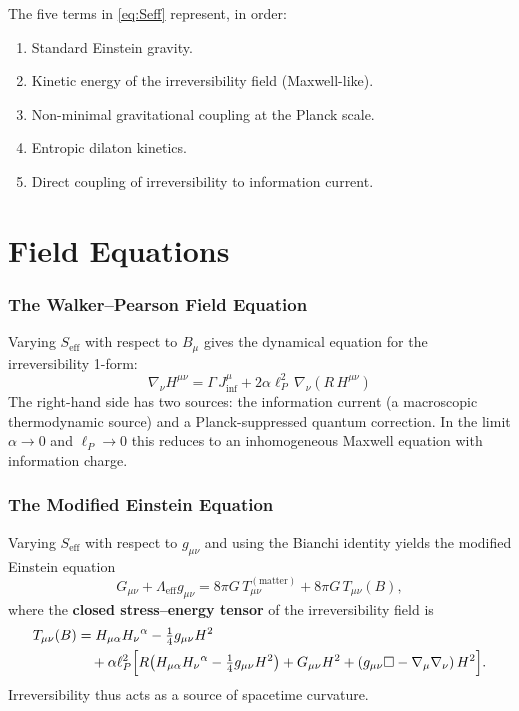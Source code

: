 \documentclass[12pt,a4paper]{article}
\newcommand{\gm}{g_{\mu\nu}}       %
\newcommand{\lP}{\ell_P}           %
\newcommand{\Seff}{S_{\text{eff}}} %
\begin{document}
The five terms in \eqref{eq:Seff} represent, in order:
\begin{enumerate}
  \item Standard Einstein gravity.
  \item Kinetic energy of the irreversibility field (Maxwell-like).
  \item Non-minimal gravitational coupling at the Planck scale.
  \item Entropic dilaton kinetics.
  \item Direct coupling of irreversibility to information current.
\end{enumerate}

\part{Field Equations}

\section{The Walker--Pearson Field Equation}
\label{sec:WP-eq}

Varying $\Seff$ with respect to $B_\mu$ gives the dynamical equation for the
irreversibility 1-form:
\begin{equation}
  \boxed{
  \nabla_\nu H^{\mu\nu}
  = \Gamma\, J_{\inf}^{\mu}
    + 2\alpha\lP^2\,\nabla_\nu\!\left(R\,H^{\mu\nu}\right)
  }
  \label{eq:WP}
\end{equation}
The right-hand side has two sources: the information current (a macroscopic
thermodynamic source) and a Planck-suppressed quantum correction.  In the limit
$\alpha\to 0$ and $\lP\to 0$ this reduces to an inhomogeneous Maxwell equation
with information charge.

\section{The Modified Einstein Equation}
\label{sec:modified-einstein}

Varying $\Seff$ with respect to $\gm$ and using the Bianchi identity yields
the modified Einstein equation
\begin{equation}
  G_{\mu\nu} + \Lambda_{\text{eff}} g_{\mu\nu}
  = 8\pi G\,T_{\mu\nu}^{(\text{matter})}
    + 8\pi G\,T_{\mu\nu}(B) ,
  \label{eq:modified-einstein}
\end{equation}
where the \textbf{closed stress--energy tensor} of the irreversibility field is
\begin{align}
  T_{\mu\nu}(B) &=
    H_{\mu\alpha}H_{\nu}{}^{\alpha}
    - \tfrac{1}{4}\gm H^2 \nonumber\\
  &\quad + \alpha\lP^2\Bigl[
      R\!\left(H_{\mu\alpha}H_\nu{}^\alpha - \tfrac{1}{4}\gm H^2\right)
      + G_{\mu\nu}H^2
      + \left(\gm\Box - \nabla_\mu\nabla_\nu\right)H^2
    \Bigr] .
  \label{eq:T-irr}
\end{align}
Irreversibility thus acts as a source of spacetime curvature.
\end{document}
